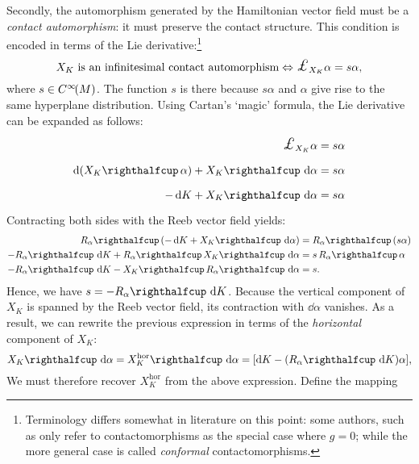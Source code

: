Secondly, the automorphism generated by the Hamiltonian vector field must be a \emph{contact automorphism}: it must preserve the contact structure. This condition is encoded in terms of the Lie derivative:\footnote
{Terminology differs somewhat in literature on this point: some authors, such as \citet{DeLeon2020} only refer to contactomorphisms as the special case where $g = 0$; while the more general case is called \emph{conformal} contactomorphisms.}
$$ X_K \text{ is an infinitesimal contact automorphism} \Leftrightarrow \lied{X_K}{\alpha} = s\alpha, $$
where $s \in C^\infty\!\qty(M)$. The function $s$ is there because $s \alpha $ and $\alpha$ give rise to the same hyperplane distribution. 
Using Cartan's `magic' formula, the Lie derivative can be expanded as follows:
\begin{equation*}
    \begin{split}
        \lied{X_K}{\alpha} &= s \alpha\\
        \dd{\qty(\intpr{X_K}{\alpha})} + \intpr{X_K}{\dd{\alpha}} &= s\alpha \\
        -\dd{K} + \intpr{X_K}{\dd{\alpha}} &= s\alpha \\
    \end{split}
\end{equation*}
Contracting both sides with the Reeb vector field yields:
\begin{equation*}
    \begin{split}
        \intpr{R_\alpha}{\qty(-\dd{K} + \intpr{X_K}{\dd{\alpha}})} &= \intpr{R_\alpha}{\qty(s\alpha)} \\
        -\intpr{R_\alpha}{\dd{K}} + \intpr{R_\alpha}{\intpr{X_K}{\dd{\alpha}}} &= s\,\intpr{R_\alpha}{\alpha} \\
        -\intpr{R_\alpha}{\dd{K}} - \intpr{X_K}{\intpr{R_\alpha}{\dd{\alpha}}} &= s.
    \end{split}
\end{equation*}
Hence, we have $s = -\intpr{R_\alpha}{\dd{K}}$. Because the vertical component of $X_K$ is spanned by the Reeb vector field, its contraction with $\dd{\alpha}$ vanishes. As a result, we can rewrite the previous expression in terms of the \emph{horizontal} component of $X_K$:
\begin{equation}
    \intpr{X_K}{\dd{\alpha}} = \intpr{X_K^\text{hor}}{\dd{\alpha}}=  \qty[\dd{K} - \qty(\intpr{R_\alpha}{\dd{K}})\alpha], 
    \label{eq:basic_form}
\end{equation}
We must therefore recover $X^\text{hor}_K$ from the above expression. Define the mapping  
